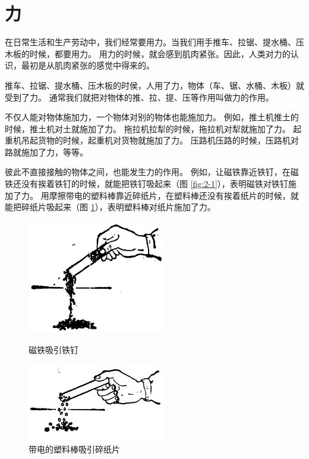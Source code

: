 \section{力}\label{sec:2-1}

在日常生活和生产劳动中，我们经常要用力。当我们用手推车、拉锯、提水桶、压木板的时候，都要用力。
用力的时候，就会感到肌肉紧张。因此，人类对力的认识，最初是从肌肉紧张的感觉中得来的。

推车、拉锯、提水桶、压木板的时侯，人用了力，物体（车、锯、水桶、木板）就受到了力。
通常我们就把对物体的推、拉、提、压等作用叫做力的作用。

不仅人能对物体施加力，一个物体对别的物体也能施加力。
例如，推土机推土的时候，推土机对土就施加了力。
拖拉机拉犁的时候，拖拉机对犁就施加了力。
起重机吊起货物的时候，起重机对货物就施加了力。
压路机压路的时候，压路机对路就施加了力，等等。

彼此不直接接触的物体之间，也能发生力的作用。
例如，让磁铁靠近铁钉，在磁铁还没有挨着铁钉的时候，就能把铁钉吸起来（图 \ref{fig:2-1}），表明磁铁对铁钉施加了力。
用摩擦带电的塑料棒靠近碎纸片，在塑料棒还没有挨着纸片的时候，就能把碎纸片吸起来（图 \ref{fig:2-2}），表明塑料棒对纸片施加了力。

\begin{figure}[htbp]
    \centering
    \begin{minipage}{7cm}
    \centering
    \includegraphics[width=6cm]{../pic/czwl1-ch2-1}
    \caption{磁铁吸引铁钉}\label{fig:2-1}
    \end{minipage}
    \qquad
    \begin{minipage}{7cm}
    \vspace{1.5cm}%
    \centering
    \includegraphics[width=6cm]{../pic/czwl1-ch2-2}
    \caption{带电的塑料棒吸引碎纸片}\label{fig:2-2}
    \end{minipage}
\end{figure}


